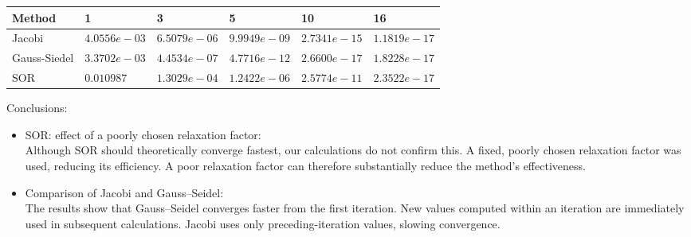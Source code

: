 \begin{center}
\begin{tabular}{|l|l|l|l|l|l|}
\hline
Method       & 1          & 3          & 5          & 10         & 16         \\ \hline
Jacobi       & $4.0556e-03$ & $6.5079e-06$ & $9.9949e-09$ & $2.7341e-15$ & $1.1819e-17$ \\ \hline
Gauss-Siedel & $3.3702e-03$ & $4.4534e-07$ & $4.7716e-12$ & $2.6600e-17$ & $1.8228e-17$ \\ \hline
SOR          & $0.010987$   & $1.3029e-04$ & $1.2422e-06$ & $2.5774e-11$ & $2.3522e-17$ \\ \hline
\end{tabular}
\end{center}
Conclusions:
\begin{itemize}
    \item SOR: effect of a poorly chosen relaxation factor:\\
    Although SOR should theoretically converge fastest, our calculations do not confirm this. A fixed, poorly chosen relaxation factor was used, reducing its efficiency. A poor relaxation factor can therefore substantially reduce the method's effectiveness.
    \item Comparison of Jacobi and Gauss--Seidel:\\
    The results show that Gauss--Seidel converges faster from the first iteration. New values computed within an iteration are immediately used in subsequent calculations. Jacobi uses only preceding-iteration values, slowing convergence.
\end{itemize}



